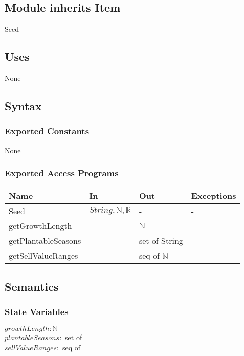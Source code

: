 \documentclass[12pt, titlepage]{article}
\begin{document}
\subsection{Module inherits Item}

Seed

\subsection{Uses}

None

\subsection{Syntax}

\subsubsection{Exported Constants}

None

\subsubsection{Exported Access Programs}

\begin{center}
\begin{tabular}{p{2cm} p{4cm} p{4cm} p{2cm}}
\hline
\textbf{Name} & \textbf{In} & \textbf{Out} & \textbf{Exceptions} \\
\hline
Seed & $String, \mathbb{N}, \mathbb{R}$ & - & - \\
\hline
getGrowthLength & - & $\mathbb{N}$ & - \\
\hline
getPlantableSeasons & - & set of String & - \\
\hline
getSellValueRanges & - & seq of $\mathbb{N}$ & - \\
\hline
\end{tabular}
\end{center}

\subsection{Semantics}

\subsubsection{State Variables}
$\mathit{growthLength}: \text{$\mathbb{N}$}$\\
$\mathit{plantableSeasons}:$ set of \\
$\mathit{sellValueRanges}:$ seq of \\
\end{document}

